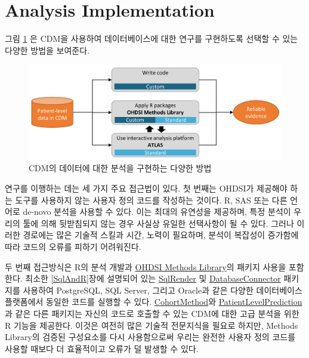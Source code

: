 \documentclass[11pt]{book}
\theoremstyle{definition}
\theoremstyle{definition}
\theoremstyle{definition}
\theoremstyle{remark}
\begin{document}
\section{Analysis Implementation}\label{analysisImplementation}

그림 \ref{fig:implementations} 은 CDM을 사용하여 데이터베이스에 대한
연구를 구현하도록 선택할 수 있는 다양한 방법을 보여준다.

\begin{figure}

{\centering \includegraphics[width=0.9\linewidth]{images/OhdsiAnalyticsTools/implementations} 

}

\caption{CDM의 데이터에 대한 분석을 구현하는 다양한 방법}\label{fig:implementations}
\end{figure}

연구를 이행하는 데는 세 가지 주요 접근법이 있다. 첫 번째는 OHDSI가
제공해야 하는 도구를 사용하지 않는 사용자 정의 코드를 작성하는 것이다.
R, SAS 또는 다른 언어로 de-novo 분석을 사용할 수 있다. 이는 최대의
유연성을 제공하며, 특정 분석이 우리의 툴에 의해 뒷받침되지 않는 경우
사실상 유일한 선택사항이 될 수 있다. 그러나 이러한 경로에는 많은 기술적
스킬과 시간, 노력이 필요하며, 분석이 복잡성이 증가함에 따라 코드의
오류를 피하기 어려워진다.

두 번째 접근방식은 R의 분석 개발과
\href{https://ohdsi.github.io/MethodsLibrary/}{OHDSI Methods Library}의
패키지 사용을 포함한다. 최소한 \ref{SqlAndR}장에 설명되어 있는
\href{https://ohdsi.github.io/SqlRender/}{SqlRender} 및
\href{https://ohdsi.github.io/DatabaseConnector/}{DatabaseConnector}
패키지를 사용하여 PostgreSQL, SQL Server, 그리고 Oracle과 같은 다양한
데이터베이스 플랫폼에서 동일한 코드를 실행할 수 있다.
\href{https://ohdsi.github.io/CohortMethod/}{CohortMethod}와
\href{https://ohdsi.github.io/PatientLevelPrediction/}{PatientLevelPrediction}과
같은 다른 패키지는 자신의 코드로 호출할 수 있는 CDM에 대한 고급 분석을
위한 R 기능을 제공한다. 이것은 여전히 많은 기술적 전문지식을 필요로
하지만, Methods Library의 검증된 구성요소를 다시 사용함으로써 우리는
완전한 사용자 정의 코드를 사용할 때보다 더 효율적이고 오류가 덜 발생할
수 있다.
\end{document}
